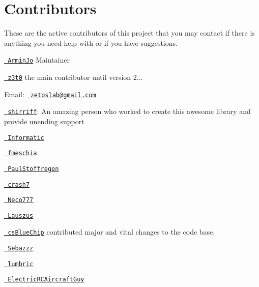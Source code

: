 \chapter{Contributors}
\hypertarget{md_C_1_2Users_2danib_2Documents_2Arduino_2libraries_2IRremote_2Contributors}{}\label{md_C_1_2Users_2danib_2Documents_2Arduino_2libraries_2IRremote_2Contributors}
\label{md_C_1_2Users_2danib_2Documents_2Arduino_2libraries_2IRremote_2Contributors_autotoc_md58}%
%


These are the active contributors of this project that you may contact if there is anything you need help with or if you have suggestions.


\begin{DoxyItemize}
\item \href{https://github.com/ArminJo}{\texttt{ Armin\+Jo}} Maintainer
\item \href{https://github.com/z3t0}{\texttt{ z3t0}} the main contributor until version 2...
\begin{DoxyItemize}
\item Email\+: \href{mailto:zetoslab@gmail.com}{\texttt{ zetoslab@gmail.\+com}}
\end{DoxyItemize}
\item \href{https://github.com/shirriff}{\texttt{ shirriff}}\+: An amazing person who worked to create this awesome library and provide unending support
\item \href{https://github.com/Informatic}{\texttt{ Informatic}}
\item \href{https://github.com/fmeschia}{\texttt{ fmeschia}}
\item \href{https://github.com/paulstroffregen}{\texttt{ Paul\+Stoffregen}}
\item \href{https://github.com/crash7}{\texttt{ crash7}}
\item \href{https://github.com/neco777}{\texttt{ Neco777}}
\item \href{https://github.com/lauszus}{\texttt{ Lauszus}}
\item \href{https://github.com/csbluechip}{\texttt{ cs\+Blue\+Chip}} contributed major and vital changes to the code base.
\item \href{https://github.com/sebazz}{\texttt{ Sebazzz}}
\item \href{https://github.com/lumbric}{\texttt{ lumbric}}
\item \href{https://github.com/electricrcaircraftguy}{\texttt{ Electric\+RCAircraft\+Guy}}

\end{DoxyItemize}
